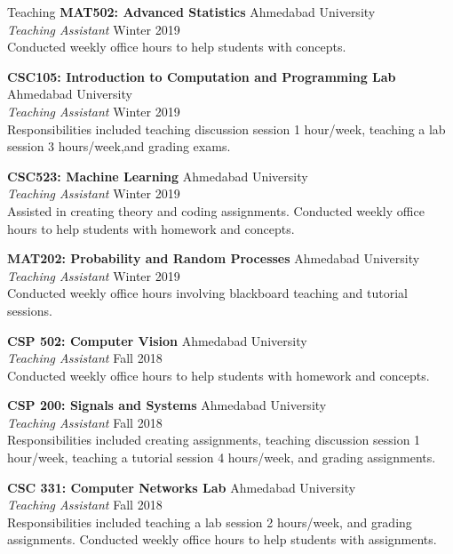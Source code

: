 \documentclass{resume}
\begin{document}
\begin{rSection}{Teaching}
{\bf MAT502: Advanced Statistics} \hfill {Ahmedabad University} \\
\textit{Teaching Assistant} \hfill{Winter 2019} \\
Conducted weekly office hours to help students with concepts.

{\bf CSC105:  Introduction to Computation and Programming Lab} \hfill {Ahmedabad University} \\
\textit{Teaching Assistant} \hfill{Winter 2019} \\
Responsibilities included teaching discussion session 1 hour/week, teaching a lab session 3 hours/week,and grading exams.

{\bf CSC523: Machine Learning } \hfill {Ahmedabad University} \\
\textit{Teaching Assistant} \hfill{Winter 2019} \\
Assisted in creating theory and coding assignments. Conducted weekly office hours to help students with homework and concepts.

{\bf MAT202: Probability and Random Processes} \hfill {Ahmedabad University} \\
\textit{Teaching Assistant} \hfill{Winter 2019} \\
Conducted weekly office hours involving blackboard teaching and tutorial sessions.

{\bf CSP 502: Computer Vision} \hfill {Ahmedabad University} \\
\textit{Teaching Assistant} \hfill{Fall 2018} \\
Conducted weekly office hours to help students with homework and concepts.

{\bf CSP 200: Signals and Systems} \hfill {Ahmedabad University} \\
\textit{Teaching Assistant} \hfill{Fall 2018} \\
Responsibilities included creating assignments, teaching discussion session 1 hour/week, teaching a tutorial session 4 hours/week, and grading assignments.

{\bf CSC 331: Computer Networks Lab} \hfill {Ahmedabad University} \\
\textit{Teaching Assistant} \hfill{Fall 2018} \\
Responsibilities included teaching a lab session 2 hours/week, and grading assignments. Conducted weekly office hours to help students with assignments.
\end{rSection}
\end{document}
